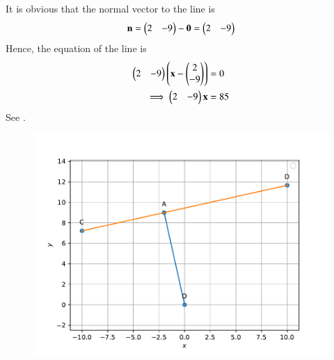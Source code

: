 It is obvious that the normal vector to the line is 
\begin{align}
\mathbf{n} =\begin{pmatrix}2 & -9\end{pmatrix} -\mathbf{0} 
=\begin{pmatrix}2 & -9\end{pmatrix}
\end{align}
Hence, the equation of the line is 
\begin{align}
	\begin{pmatrix}2 & -9\end{pmatrix}\left(\mathbf{x} - \begin{pmatrix}2 \\ -9\end{pmatrix}\right)&= 0
	\\
	\implies 
	\begin{pmatrix}2 & -9\end{pmatrix}\mathbf{x} &= 85
\end{align}
See 
		.
	\begin{figure}[!ht]
		\centering
 \includegraphics[width=\columnwidth]{chapters/11/10/2/15/figs/line.pdf}
		\caption{}
		\label{fig:11/10/2/15}
  	\end{figure}

